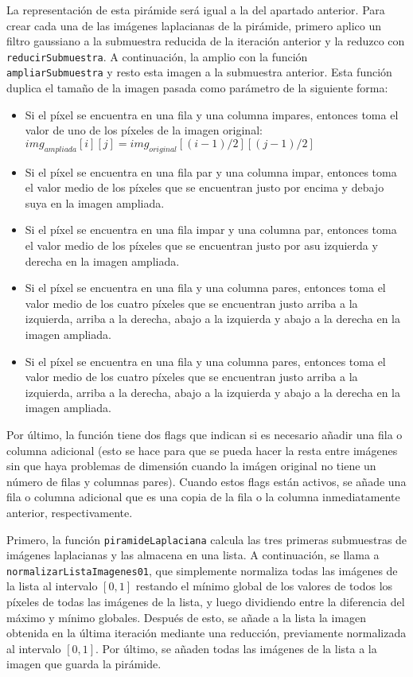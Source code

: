 \documentclass[10pt,a4paper]{article}
\begin{document}
\begin{list}{•}{}
La representación de esta pirámide será igual a la del apartado anterior. Para crear cada una de las imágenes laplacianas de la pirámide, primero aplico un filtro gaussiano a la submuestra reducida de la iteración anterior y la reduzco con \texttt{reducirSubmuestra}. A continuación, la amplio con la función \texttt{ampliarSubmuestra} y resto esta imagen a la submuestra anterior. Esta función duplica el tamaño de la imagen pasada como parámetro de la siguiente forma:
\begin{itemize}
\item Si el píxel se encuentra en una fila y una columna impares, entonces toma el valor de uno de los píxeles de la imagen original: $img_{ampliada}[i][j] = img_{original}[(i-1)/2][(j-1)/2]$
\item Si el píxel se encuentra en una fila par y una columna impar, entonces toma el valor medio de los píxeles que se encuentran justo por encima y debajo suya en la imagen ampliada.
\item Si el píxel se encuentra en una fila impar y una columna par, entonces toma el valor medio de los píxeles que se encuentran justo por asu izquierda y derecha en la imagen ampliada.
\item Si el píxel se encuentra en una fila y una columna pares, entonces toma el valor medio de los cuatro píxeles que se encuentran justo arriba a la izquierda, arriba a la derecha, abajo a la izquierda y abajo a la derecha en la imagen ampliada.
\item Si el píxel se encuentra en una fila y una columna pares, entonces toma el valor medio de los cuatro píxeles que se encuentran justo arriba a la izquierda, arriba a la derecha, abajo a la izquierda y abajo a la derecha en la imagen ampliada.
\end{itemize}

Por último, la función tiene dos flags que indican si es necesario añadir una fila o columna adicional (esto se hace para que se pueda hacer la resta entre imágenes sin que haya problemas de dimensión cuando la imágen original no tiene un número de filas y columnas pares). Cuando estos flags están activos, se añade una fila o columna adicional que es una copia de la fila o la columna inmediatamente anterior, respectivamente.

Primero, la función \texttt{piramideLaplaciana} calcula las tres primeras submuestras de imágenes laplacianas y las almacena en una lista. A continuación, se llama a \texttt{normalizarListaImagenes01}, que simplemente normaliza todas las imágenes de la lista al intervalo $[0,1]$ restando el mínimo global de los valores de todos los píxeles de todas las imágenes de la lista, y luego dividiendo entre la diferencia del máximo y mínimo globales. Después de esto, se añade a la lista la imagen obtenida en la última iteración mediante una reducción, previamente normalizada al intervalo $[0,1]$. Por último, se añaden todas las imágenes de la lista a la imagen que guarda la pirámide.

\hfill \break

\end{list}
\end{document}
